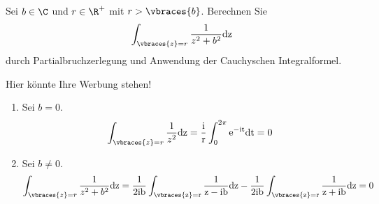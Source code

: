 \begin{exercise}
    Sei $b \in \C$ und $r \in \R^+$ mit $r > \vbraces{b}$. Berechnen Sie 
    \begin{align*}
        \int_{\vbraces{z} = r} \frac{1}{z^2 + b^2} \rm{d}z
    \end{align*}
    durch Partialbruchzerlegung und Anwendung der Cauchyschen Integralformel.
\end{exercise}

\begin{solution}
    Hier könnte Ihre Werbung stehen!
    \begin{enumerate}[label = Fall \arabic*:]
        \item Sei $b = 0$. 
        \begin{align*}
            \int_{\vbraces{z} = r} \frac{1}{z^2} \rm{d}z = \frac{\rm{i}}{r} \int_0^{2\pi}  \rm{e}^{-\rm{i}t} \rm{d}t = 0
        \end{align*}
        \item Sei $b \neq 0$.
        \begin{align*}
            \int_{\vbraces{z} = r} \frac{1}{z^2 + b^2} \rm{d}z = \frac{1}{2\rm{i}b} \int_{\vbraces{z} = r} \frac{1}{z - \rm{i}b} \rm{d}z - \frac{1}{2\rm{i}b} \int_{\vbraces{z} = r} \frac{1}{z + \rm{i}b} \rm{d}z = 0
        \end{align*}
    \end{enumerate}
\end{solution}